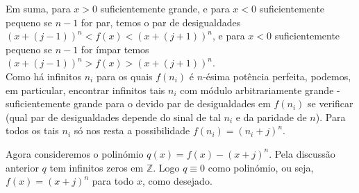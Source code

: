 \documentclass[main.tex]{subfiles}
\begin{document}
\begin{solution}
Em suma, para $x>0$ suficientemente grande,
e para $x<0$ suficientemente pequeno se $n-1$ for par, temos
o par de desigualdades
$(x+(j-1))^n<f(x)<(x+(j+1))^n$,
e para $x<0$ suficientemente pequeno se $n-1$ for ímpar temos
$(x+(j-1))^n>f(x)>(x+(j+1))^n$.
\\

Como há infinitos $n_i$ para os quais $f(n_i)$ é $n$-ésima potência perfeita,
podemos, em particular, encontrar infinitos tais $n_i$ com módulo arbitrariamente
grande - suficientemente grande para o devido par de desigualdades em
$f(n_i)$ se verificar (qual par de desigualdades depende do sinal de tal $n_i$
e da paridade de $n$). Para todos os tais $n_i$ só nos resta a possibilidade
$f(n_i)=(n_i+j)^n$.

Agora consideremos o polinómio $q(x)=f(x)-(x+j)^n$. Pela discussão anterior $q$
tem infinitos zeros em $\mathbb{Z}$.
Logo $q\equiv 0$ como polinómio, ou seja, $f(x)=(x+j)^n$ para todo $x$,
como desejado.
\end{solution}
\end{document}
